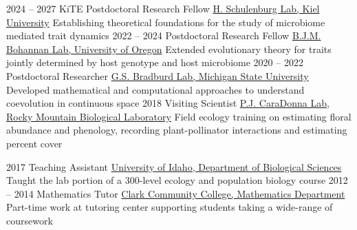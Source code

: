 \documentclass[9pt]{developercv} %
\begin{document}
\vspace{-0 pt}
\begin{entrylist}
	\entry
        {2024 -- 2027}
        {KiTE Postdoctoral Research Fellow}
        {\href{https://evoecogen-kiel.de/}{H. Schulenburg Lab, Kiel University}}
        {Establishing theoretical foundations for the study of microbiome mediated trait dynamics}
        \entry
        {2022 -- 2024}
        {Postdoctoral Research Fellow}
        {\href{https://pages.uoregon.edu/bohannanlab/}{B.J.M. Bohannan Lab, University of Oregon}}
        {Extended evolutionary theory for traits jointly determined by host genotype and host microbiome}
        \entry
        {2020 -- 2022}
		{Postdoctoral Researcher}
		{\href{http://www.genescape.org/people.html}{G.S. Bradburd Lab, Michigan State University}}
		{Developed mathematical and computational approaches to understand coevolution in continuous space}
        \entry
        {2018}
		{Visiting Scientist}
		{\href{http://paulcaradonna.weebly.com/}{P.J. CaraDonna Lab, Rocky Mountain Biological Laboratory}}
		{Field ecology training on estimating floral abundance and phenology, recording plant-pollinator interactions and estimating percent cover}
\end{entrylist}

\vspace{-5 pt}
\begin{entrylist}
	\entry
        {2017}
		{Teaching Assistant}
		{\href{https://www.uidaho.edu/sci/biology}{University of Idaho, Department of Biological Sciences}}
        {Taught the lab portion of a 300-level ecology and population biology course}
        \entry
        {2012 -- 2014}
		{Mathematics Tutor}
		{\href{https://www.clark.edu/academics/programs/dept/mathematics/}{Clark Community College, Mathematics Department}}
        {Part-time work at tutoring center supporting students taking a wide-range of coursework}
\end{entrylist}
\end{document}
